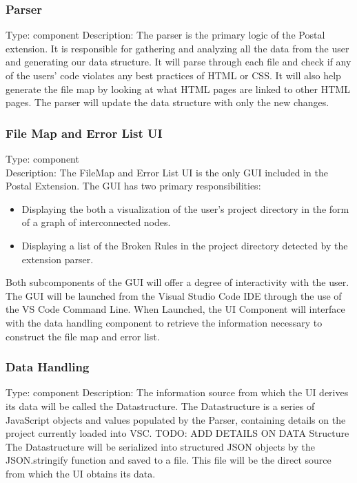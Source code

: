\documentclass[letterpaper,10pt,titlepage,draftclsnofoot,onecolumn,onesided] {IEEEtran}
\begin{document}
	\subsubsection{Parser}
	Type: component
	Description: The parser is the primary logic of the Postal extension. 
	It is responsible for gathering and analyzing all the data from the user and generating our data structure.
	It will parse through each file and check if any of the users' code violates any best practices of HTML or CSS. 
	It will also help generate the file map by looking at what HTML pages are linked to other HTML pages.
	The parser will update the data structure with only the new changes.
	
		
	
	\subsubsection{File Map and Error List UI}
	Type: component
	\\
	Description: The FileMap and Error List UI is the only GUI included in the Postal Extension. 
	The GUI has two primary responsibilities: 
	\begin{itemize}
	\item Displaying the both a visualization of the user's project directory in the form of a graph of interconnected nodes.
	\item Displaying a list of the Broken Rules in the project directory detected by the extension parser.
	\end{itemize}
	Both subcomponents of the GUI will offer a degree of interactivity with the user. 
	The GUI will be launched from the Visual Studio Code IDE through the use of the VS Code Command Line.
	When Launched, the UI Component will interface with the data handling component to retrieve the information necessary to construct the file map and error list.

	
	\subsubsection{Data Handling} 
	Type: component
	Description: The information source from which the UI derives its data will be called the Datastructure. 
	The Datastructure is a series of JavaScript objects and values populated by the Parser, containing details on the project currently loaded into VSC. 
	TODO: ADD DETAILS ON DATA Structure
	The Datastructure will be serialized into structured JSON objects by the JSON.stringify function and saved to a file. 
	This file will be the direct source from which the UI obtains its data.
\end{document}
